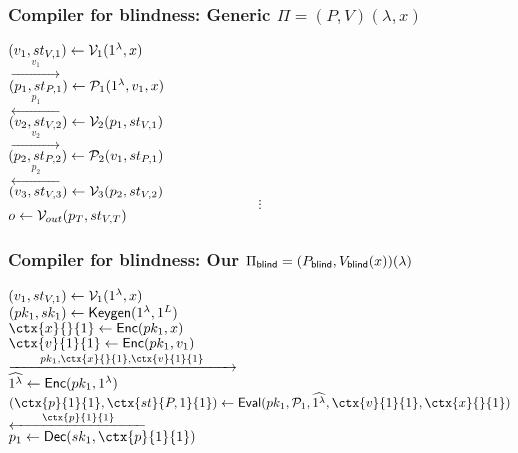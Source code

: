 \documentclass{beamer}
\begin{document}
\begin{frame}
	\frametitle{Compiler for blindness: Generic $\Pi=(P, V)(\lambda, x)$}
	\pause
	$(v_1, st_{V, 1})\leftarrow\mathcal{V}_1(1^\lambda, x)$
	\pause
	\\\hspace*{\fill}$\xrightarrow{\qquad v_1\qquad}$\hspace*{\fill}
	\pause
	\\\hspace*{\fill}$(p_1, st_{P, 1})\leftarrow\mathcal{P}_1(1^\lambda, v_1, x)$
	\pause
	\\\hspace*{\fill}$\xleftarrow{\qquad p_1\qquad}$\hspace*{\fill}
	\pause
	\\$(v_2, st_{V, 2})\leftarrow\mathcal{V}_2(p_1, st_{V, 1})$
	\pause
	\\\hspace*{\fill}$\xrightarrow{\qquad v_2\qquad}$\hspace*{\fill}
	\pause
	\\\hspace*{\fill}$(p_2, st_{P, 2})\leftarrow\mathcal{P}_2(v_1, st_{P, 1})$
	\pause
	\\\hspace*{\fill}$\xleftarrow{\qquad p_2\qquad}$\hspace*{\fill}
	\pause
	\\$(v_3, st_{V, 3})\leftarrow\mathcal{V}_3(p_2, st_{V, 2})$
	\pause
	$$\vdots$$
	\pause
	$o\leftarrow\mathcal{V}_{out}(p_T, st_{V,T})$
\end{frame}

\begin{frame}
	\frametitle{Compiler for blindness: Our $\Pi_{\mathsf{blind}}=(P_{\mathsf{blind}}, V_{\mathsf{blind}}(x))(\lambda)$}
	$(v_1, st_{V, 1})\leftarrow\mathcal{V}_1(1^\lambda, x)$
	\pause
	\\$(pk_1, sk_1)\leftarrow\mathsf{Keygen}(1^\lambda, 1^L)$
	\pause
	\\$\ctx{x}{}{1}\leftarrow\Enc(pk_1, x)$
	\pause
	\\$\ctx{v}{1}{1}\leftarrow\Enc(pk_1, v_1)$
	\pause
	\\\hspace*{\fill}$\xrightarrow{\qquad pk_1, \ctx{x}{}{1}, \ctx{v}{1}{1}\qquad}$\hspace*{\fill}
	\pause
	\\\hspace*{\fill}$\widehat{1^\lambda}\leftarrow\mathsf{Enc}(pk_1, 1^\lambda)$
	\pause
	\\\hspace*{\fill}$(\ctx{p}{1}{1}, \ctx{st}{P, 1}{1})\leftarrow\Eval(pk_1, \cP_1, \widehat{1^\lambda}, \ctx{v}{1}{1}, \ctx{x}{}{1})$
	\pause
	\\\hspace*{\fill}$\xleftarrow{\qquad \ctx{p}{1}{1}\qquad}$\hspace*{\fill}
	\pause
	\\$p_1\leftarrow\Dec(sk_1, \ctx{p}{1}{1})$
\end{frame}
\end{document}
